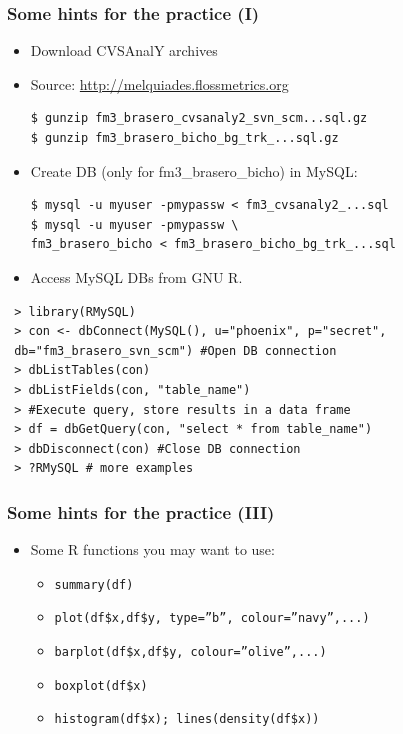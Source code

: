 \documentclass{beamer}
\begin{document}

\begin{frame}[fragile]
\frametitle{Some hints for the practice (I)}
\begin{itemize}
\item Download CVSAnalY archives\\
\item Source: \url{http://melquiades.flossmetrics.org}
 \begin{verbatim}
$ gunzip fm3_brasero_cvsanaly2_svn_scm...sql.gz
$ gunzip fm3_brasero_bicho_bg_trk_...sql.gz
\end{verbatim}
\item Create DB (only for fm3\_brasero\_bicho) in MySQL:
\begin{verbatim}
$ mysql -u myuser -pmypassw < fm3_cvsanaly2_...sql
$ mysql -u myuser -pmypassw \
fm3_brasero_bicho < fm3_brasero_bicho_bg_trk_...sql
 \end{verbatim}
\end{itemize}
\end{frame}


\begin{frame}[fragile]

\begin{itemize}
 \item Access MySQL DBs from GNU R.
\end{itemize}
\vspace{-0.5cm}
\begin{verbatim}
 > library(RMySQL)
 > con <- dbConnect(MySQL(), u="phoenix", p="secret",
 db="fm3_brasero_svn_scm") #Open DB connection
 > dbListTables(con)
 > dbListFields(con, "table_name")
 > #Execute query, store results in a data frame
 > df = dbGetQuery(con, "select * from table_name") 
 > dbDisconnect(con) #Close DB connection
 > ?RMySQL # more examples
\end{verbatim}

\end{frame}


\begin{frame}[fragile]
\frametitle{Some hints for the practice (III)}
\begin{itemize}
\item Some R functions you may want to use:
  \begin{itemize}
  \item \texttt{summary(df)}
  \item \texttt{plot(df\$x,df\$y, type=''b'', colour=''navy'',...)}
  \item \texttt{barplot(df\$x,df\$y, colour=''olive'',...)}
  \item \texttt{boxplot(df\$x)}
  \item \texttt{histogram(df\$x); lines(density(df\$x))}
  \end{itemize}
\end{itemize}
\end{frame}
\end{document}
